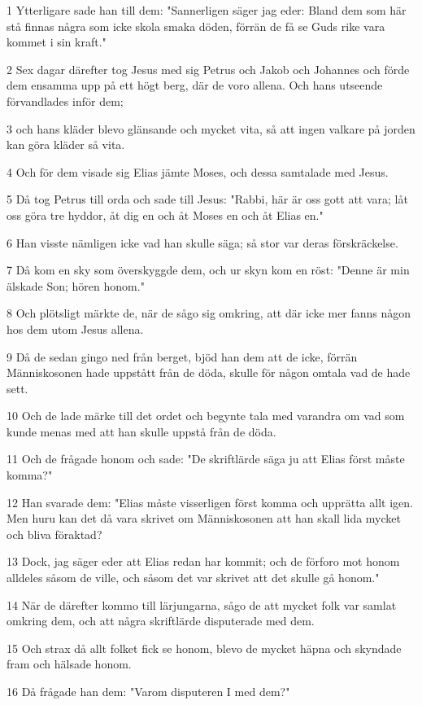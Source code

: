 \par 1 Ytterligare sade han till dem: "Sannerligen säger jag eder: Bland dem som här stå finnas några som icke skola smaka döden, förrän de få se Guds rike vara kommet i sin kraft."
\par 2 Sex dagar därefter tog Jesus med sig Petrus och Jakob och Johannes och förde dem ensamma upp på ett högt berg, där de voro allena. Och hans utseende förvandlades inför dem;
\par 3 och hans kläder blevo glänsande och mycket vita, så att ingen valkare på jorden kan göra kläder så vita.
\par 4 Och för dem visade sig Elias jämte Moses, och dessa samtalade med Jesus.
\par 5 Då tog Petrus till orda och sade till Jesus: "Rabbi, här är oss gott att vara; låt oss göra tre hyddor, åt dig en och åt Moses en och åt Elias en."
\par 6 Han visste nämligen icke vad han skulle säga; så stor var deras förskräckelse.
\par 7 Då kom en sky som överskyggde dem, och ur skyn kom en röst: "Denne är min älskade Son; hören honom."
\par 8 Och plötsligt märkte de, när de sågo sig omkring, att där icke mer fanns någon hos dem utom Jesus allena.
\par 9 Då de sedan gingo ned från berget, bjöd han dem att de icke, förrän Människosonen hade uppstått från de döda, skulle för någon omtala vad de hade sett.
\par 10 Och de lade märke till det ordet och begynte tala med varandra om vad som kunde menas med att han skulle uppstå från de döda.
\par 11 Och de frågade honom och sade: "De skriftlärde säga ju att Elias först måste komma?"
\par 12 Han svarade dem: "Elias måste visserligen först komma och upprätta allt igen. Men huru kan det då vara skrivet om Människosonen att han skall lida mycket och bliva föraktad?
\par 13 Dock, jag säger eder att Elias redan har kommit; och de förforo mot honom alldeles såsom de ville, och såsom det var skrivet att det skulle gå honom."
\par 14 När de därefter kommo till lärjungarna, sågo de att mycket folk var samlat omkring dem, och att några skriftlärde disputerade med dem.
\par 15 Och strax då allt folket fick se honom, blevo de mycket häpna och skyndade fram och hälsade honom.
\par 16 Då frågade han dem: "Varom disputeren I med dem?"
